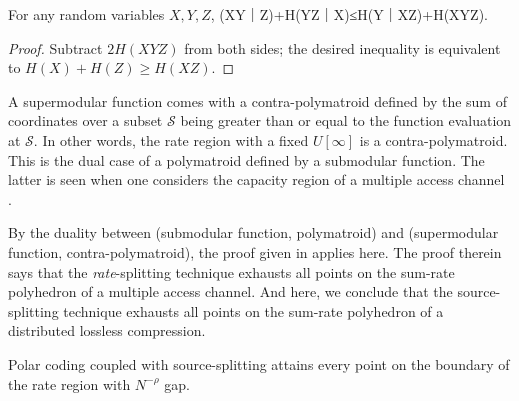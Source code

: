 \documentclass[openany]{amsbook}
\numberwithin{equation}{chapter}
\numberwithin{figure}{chapter}
\numberwithin{table}{chapter}
\def\[#1\]{\begin{equation*}{#1}\end{equation*}}
\theoremstyle{definition}	理dfn:Definition~?s			理exa:Example~?s
\theoremstyle{remark}		理cla:Claim~?s				理rem:Remark~?s
\begin{document}
	\begin{lem}[Supermodularity]
		For any random variables $X,Y,Z$,
		\[H(XY｜Z)+H(YZ｜X)≤H(Y｜XZ)+H(XYZ).\]
	\end{lem}
	
	\begin{proof}
		Subtract $2H(XYZ)$ from both sides;
		the desired inequality is equivalent to $H(X)+H(Z)≥H(XZ)$.
	\end{proof}
	
	A supermodular function comes with a contra-polymatroid
	defined by the sum of coordinates over a subset $𝒮$ being
	greater than or equal to the function evaluation at $𝒮$.
	In other words, the rate region with a fixed $U[∞]$ is a contra-polymatroid.
	This is the dual case of a polymatroid defined by a submodular function.
	The latter is seen when one considers
	the capacity region of a multiple access channel \cite{GRUW01}.
	
	By the duality between (submodular function, polymatroid)
	and (supermodular function, contra-polymatroid),
	the proof given in \cite{GRUW01} applies here.
	The proof therein says that the \emph{rate}-splitting technique exhausts
	all points on the sum-rate polyhedron of a multiple access channel.
	And here, we conclude that the source-splitting technique exhausts
	all points on the sum-rate polyhedron of a distributed lossless compression.
	
	\begin{cor}
		Polar coding coupled with source-splitting attains every point
		on the boundary of the rate region with $N^{-ρ}$ gap.
	\end{cor}
	
\end{document}
